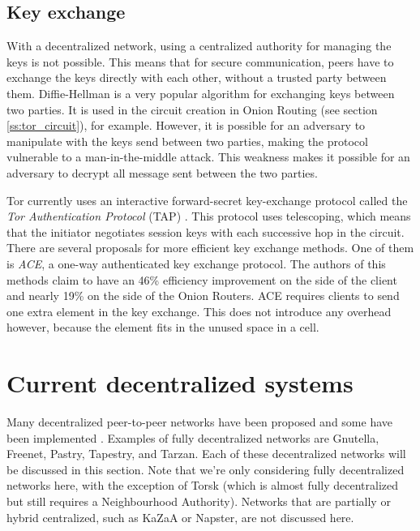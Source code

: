 \documentclass{article}
\begin{document}
	\subsection{Key exchange}
		With a decentralized network, using a centralized authority for managing the keys is not possible. This means that for secure communication, peers have to exchange the keys directly with each other, without a trusted party between them. Diffie-Hellman is a very popular algorithm for exchanging keys between two parties. It is used in the circuit creation in Onion Routing (see section \ref{ss:tor_circuit}), for example. However, it is possible for an adversary to manipulate with the keys send between two parties, making the protocol vulnerable to a man-in-the-middle attack. This weakness makes it possible for an adversary to decrypt all message sent between the two parties.

		Tor currently uses an interactive forward-secret key-exchange protocol called the \emph{Tor Authentication Protocol} (TAP) \cite{backes2012ace}. This protocol uses telescoping, which means that the initiator negotiates session keys with each successive hop in the circuit. There are several proposals for more efficient key exchange methods. One of them is \emph{ACE}, a one-way authenticated key exchange protocol. The authors of this methods claim to have an 46\% efficiency improvement on the side of the client and nearly 19\% on the side of the Onion Routers. ACE requires clients to send one extra element in the key exchange. This does not introduce any overhead however, because the element fits in the unused space in a cell.

\section{Current decentralized systems}
	\label{sec:decentralized}
	
	Many decentralized peer-to-peer networks have been proposed and some have been implemented \cite{mislove2004ap3, rennhard2002introducing, panchenko2006nisan, rowstron2001pastry, nambiar2006salsa, freedman2002tarzan, ripeanu2001peer, androutsellis2004survey}. Examples of fully decentralized networks are Gnutella, Freenet, Pastry, Tapestry, and Tarzan. Each of these decentralized networks will be discussed in this section. Note that we're only considering fully decentralized networks here, with the exception of Torsk (which is almost fully decentralized but still requires a Neighbourhood Authority). Networks that are partially or hybrid centralized, such as KaZaA or Napster, are not discussed here.
\end{document}
